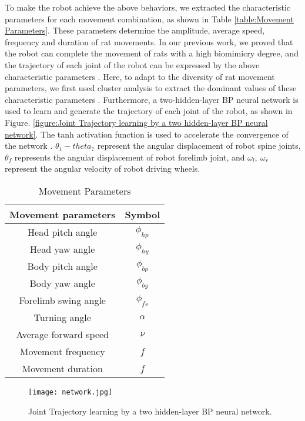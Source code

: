 To make the robot achieve the above behaviors, we extracted the characteristic
parameters for each movement combination, as shown in Table \ref{table:Movement
Parameters}. These parameters determine the amplitude, average speed, frequency
and duration of rat movements. In our previous work, we proved that the robot
can complete the movement of rats with a high biomimicry degree, and the
trajectory of each joint of the robot can be expressed by the above
characteristic parameters \cite{shi-gao-tro-2021}. Here, to adapt to the
diversity of rat movement parameters, we first used cluster analysis to extract
the dominant values of these characteristic parameters
\cite{fraley_how_many_clusters,kaufman_finding_groups}. Furthermore, a
two-hidden-layer BP neural network is used to learn and generate the trajectory
of each joint of the robot, as shown in Figure. \ref{figure:Joint Trajectory
learning by a two hidden-layer BP neural network}. The tanh activation function
is used to accelerate the convergence of the network
\cite{inohira-generalization}. $\theta_1-theta_7$ represent the angular
displacement of robot spine joints, $\theta_f$ represents the angular
displacement of robot forelimb joint, and $\omega_l,~\omega_r$ represent the
angular velocity of robot driving wheels.

\begin{table}[b]
    \caption{Movement Parameters}
    \centering
    \begin{tabular}{cc}
            \hline
            Movement parameters & Symbol \\
            \hline
            Head pitch angle & $\phi_{hp}$ \\
            Head yaw angle & $\phi_{hy}$ \\
            Body pitch angle & $\phi_{bp}$ \\
            Body yaw angle & $\phi_{by}$ \\
            Forelimb swing angle & $\phi_{fs}$ \\
            Turning angle & $\alpha$ \\
            Average forward speed & $\nu$ \\
            Movement frequency & $f$ \\
            Movement duration & $f$ \\
            \hline
            \end{tabular}
    \label{table:Movement Parameters}
\end{table}

\begin{figure}[h]
    \centering
    \texttt{[image: network.jpg]}
    \caption{Joint Trajectory learning by a two hidden-layer BP neural network.}
    \label{figure:Joint Trajectory learning by a two hidden-layer BP neural
    network}
\end{figure}


